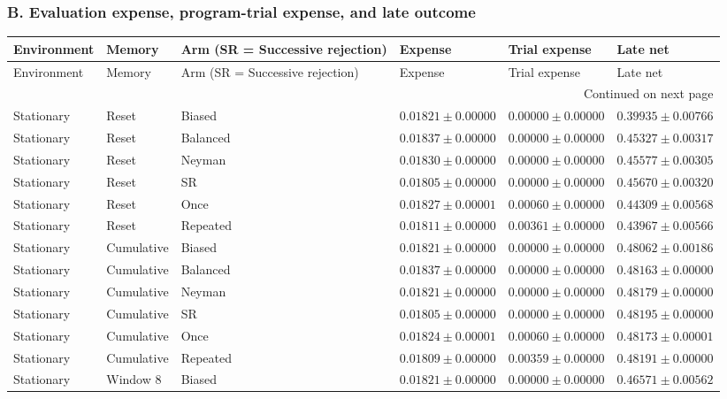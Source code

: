 \subsubsection*{B. Evaluation expense, program-trial expense, and late outcome}
\begingroup\footnotesize\setlength{\tabcolsep}{4pt}

\begin{longtable}{@{}llllll@{}}
\toprule Environment & Memory & Arm (SR = Successive rejection) & Expense & Trial expense & Late net \\\midrule\endfirsthead
\toprule Environment & Memory & Arm (SR = Successive rejection) & Expense & Trial expense & Late net \\\midrule\endhead
\midrule\multicolumn{6}{r}{Continued on next page}\\\endfoot
\bottomrule\endlastfoot
Stationary & Reset & Biased & $0.01821 \pm 0.00000$ & $0.00000 \pm 0.00000$ & $0.39935 \pm 0.00766$ \\
Stationary & Reset & Balanced & $0.01837 \pm 0.00000$ & $0.00000 \pm 0.00000$ & $0.45327 \pm 0.00317$ \\
Stationary & Reset & Neyman & $0.01830 \pm 0.00000$ & $0.00000 \pm 0.00000$ & $0.45577 \pm 0.00305$ \\
Stationary & Reset & SR & $0.01805 \pm 0.00000$ & $0.00000 \pm 0.00000$ & $0.45670 \pm 0.00320$ \\
Stationary & Reset & Once & $0.01827 \pm 0.00001$ & $0.00060 \pm 0.00000$ & $0.44309 \pm 0.00568$ \\
Stationary & Reset & Repeated & $0.01811 \pm 0.00000$ & $0.00361 \pm 0.00000$ & $0.43967 \pm 0.00566$ \\
Stationary & Cumulative & Biased & $0.01821 \pm 0.00000$ & $0.00000 \pm 0.00000$ & $0.48062 \pm 0.00186$ \\
Stationary & Cumulative & Balanced & $0.01837 \pm 0.00000$ & $0.00000 \pm 0.00000$ & $0.48163 \pm 0.00000$ \\
Stationary & Cumulative & Neyman & $0.01821 \pm 0.00000$ & $0.00000 \pm 0.00000$ & $0.48179 \pm 0.00000$ \\
Stationary & Cumulative & SR & $0.01805 \pm 0.00000$ & $0.00000 \pm 0.00000$ & $0.48195 \pm 0.00000$ \\
Stationary & Cumulative & Once & $0.01824 \pm 0.00001$ & $0.00060 \pm 0.00000$ & $0.48173 \pm 0.00001$ \\
Stationary & Cumulative & Repeated & $0.01809 \pm 0.00000$ & $0.00359 \pm 0.00000$ & $0.48191 \pm 0.00000$ \\
Stationary & Window 8 & Biased & $0.01821 \pm 0.00000$ & $0.00000 \pm 0.00000$ & $0.46571 \pm 0.00562$ \\

\end{longtable}
